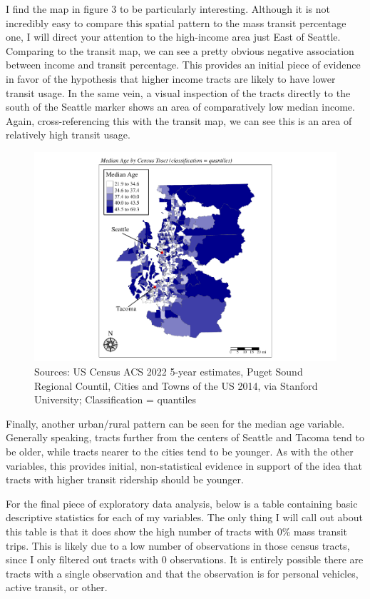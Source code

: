 \documentclass[
]{article}
\begin{document}
I find the map in figure 3 to be particularly interesting. Although it
is not incredibly easy to compare this spatial pattern to the mass
transit percentage one, I will direct your attention to the high-income
area just East of Seattle. Comparing to the transit map, we can see a
pretty obvious negative association between income and transit
percentage. This provides an initial piece of evidence in favor of the
hypothesis that higher income tracts are likely to have lower transit
usage. In the same vein, a visual inspection of the tracts directly to
the south of the Seattle marker shows an area of comparatively low
median income. Again, cross-referencing this with the transit map, we
can see this is an area of relatively high transit usage.

\newpage

\begin{figure}
\centering
\includegraphics{transit-hotspots-PSRC_files/figure-latex/unnamed-chunk-7-1.pdf}
\caption{Sources: US Census ACS 2022 5-year estimates, Puget Sound
Regional Countil, Cities and Towns of the US 2014, via Stanford
University; Classification = quantiles}
\end{figure}

Finally, another urban/rural pattern can be seen for the median age
variable. Generally speaking, tracts further from the centers of Seattle
and Tacoma tend to be older, while tracts nearer to the cities tend to
be younger. As with the other variables, this provides initial,
non-statistical evidence in support of the idea that tracts with higher
transit ridership should be younger.

For the final piece of exploratory data analysis, below is a table
containing basic descriptive statistics for each of my variables. The
only thing I will call out about this table is that it does show the
high number of tracts with 0\% mass transit trips. This is likely due to
a low number of observations in those census tracts, since I only
filtered out tracts with 0 observations. It is entirely possible there
are tracts with a single observation and that the observation is for
personal vehicles, active transit, or other.
\end{document}
